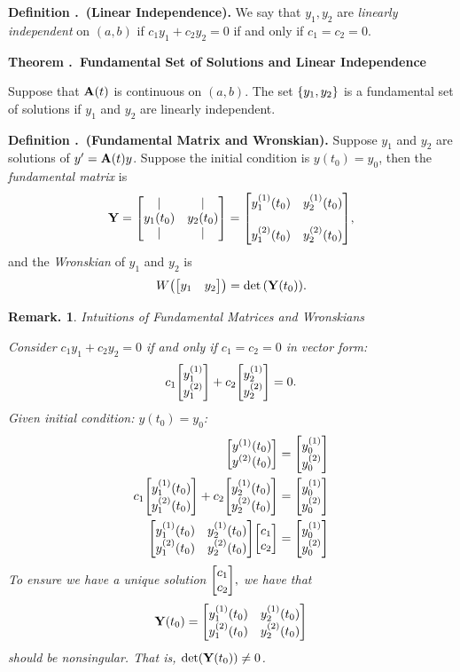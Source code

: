 \documentclass[12pt, a4paper]{article}
\newcounter{index}[subsection]
\newenvironment*{df}[1]{\par\noindent\textbf{Definition \thesubsection.\stepcounter{index}\theindex\ (#1).}}{\par}
\newenvironment*{thm}[1]{\begin{tcolorbox}\par\noindent\textbf{Theorem \thesubsection.\stepcounter{index}\theindex\ #1} \par}{\par\end{tcolorbox}}
\newtheorem*{rmk}{Remark.}
\def\A{\vb A}
\def\Y{\vb Y}
\begin{document}
\begin{df}{Linear Independence}
	We say that $y_1,y_2$ are \textit{linearly independent} on $(a,b)$	if $c_1y_1+c_2y_2=0$ if and only if $c_1=c_2=0$.
\end{df}
\begin{thm}{Fundamental Set of Solutions and Linear Independence}
	Suppose that $\A(t)$ is continuous on $(a,b)$. The set $\qty{y_1,y_2}$ is a fundamental set of solutions if $y_1$ and $y_2$ are linearly independent. 	
\end{thm}
\begin{df}{Fundamental Matrix and Wronskian}
	Suppose $y_1$ and $y_2$ are solutions of $y'=\A(t)y$. Suppose the initial condition is $y(t_0)=y_0$, then the \textit{fundamental matrix} is \[\Y=\mqty[|&|\\y_1(t_0)&y_2(t_0)\\|&|]=\mqty[y_1^{(1)}(t_0)&y_2^{(1)}(t_0)\\\\y_1^{(2)}(t_0)&y_2^{(2)}(t_0)],\] and the \textit{Wronskian} of $y_1$ and $y_2$ is \[W\qty(\mqty[y_1&y_2])=\det\qty(\Y(t_0)).\]
\end{df}
\begin{rmk}{Intuitions of Fundamental Matrices and Wronskians}
	\par Consider $c_1y_1+c_2y_2=0$ if and only if $c_1=c_2=0$ in vector form: \[c_1\mqty[y_1^{(1)}\\y_{1}^{(2)}]+c_2\mqty[y_2^{(1)}\\y_2^{(2)}]=0.\] Given initial condition: $y(t_0)=y_0$: \begin{align*}\mqty[y^{(1)}(t_0)\\y^{(2)}(t_0)]&=\mqty[y_0^{(1)}\\y_0^{(2)}]\\c_1\mqty[y_1^{(1)}(t_0)\\y_1^{(2)}(t_0)]+c_2\mqty[y_2^{(1)}(t_0)\\y_2^{(2)}(t_0)]&=\mqty[y_0^{(1)}\\y_0^{(2)}]\\\mqty[y_1^{(1)}(t_0)&y_2^{(1)}(t_0)\\y_1^{(2)}(t_0)&y_2^{(2)}(t_0)]\mqty[c_1\\c_2]&=\mqty[y_0^{(1)}\\y_0^{(2)}]\end{align*} To ensure we have a unique solution $\mqty[c_1\\c_2],$ we have that \[\Y(t_0)=\mqty[y_1^{(1)}(t_0)&y_2^{(1)}(t_0)\\y_1^{(2)}(t_0)&y_2^{(2)}(t_0)]\] should be nonsingular. That is, $\det(\Y(t_0))\neq0$.
\end{rmk}
\end{document}
